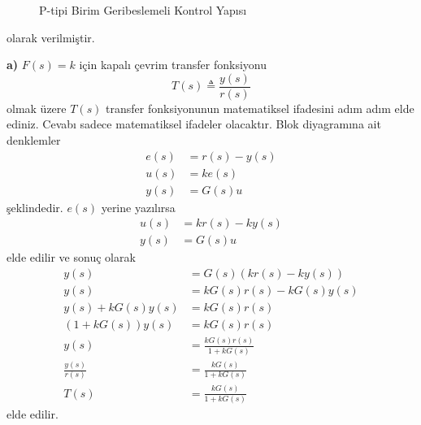 \begin{figure}[!h]
	\centering
	\caption{P-tipi Birim Geribeslemeli Kontrol Yapısı}
	\label{fig:PTipiKontrolBlokDiyagrami}
\end{figure}
olarak verilmiştir.

\noindent\textbf{a)} $F(s)=k$ için kapalı çevrim transfer fonksiyonu
\begin{equation*}
	T(s)\triangleq \frac{y(s)}{r(s)}
\end{equation*}
olmak üzere $T(s)$ transfer fonksiyonunun matematiksel ifadesini adım adım elde ediniz. Cevabı sadece matematiksel ifadeler olacaktır.
Blok diyagramına ait denklemler
\begin{equation}
\begin{split}
    e(s)&=r(s)-y(s)\\
    u(s)&=k e(s)\\
    y(s)&=G(s)u
\end{split}
\end{equation}
şeklindedir. $e(s)$ yerine yazılırsa
\begin{equation}
    \begin{split}
        u(s)&=k r(s)-k y(s)\\
        y(s)&=G(s)u
    \end{split}
\end{equation}
elde edilir ve sonuç olarak
\begin{equation}
    \begin{split}
        y(s)&=G(s)(k r(s)-k y(s))\\
        y(s)&=kG(s)r(s)-k G(s)y(s)\\
        y(s)+k G(s)y(s)&=kG(s)r(s)\\
        (1+k G(s))y(s)&=kG(s)r(s)\\
        y(s)&=\frac{kG(s)r(s)}{1+k G(s)}\\
        \frac{y(s)}{r(s)}&=\frac{kG(s)}{1+k G(s)}\\
        T(s)&=\frac{kG(s)}{1+k G(s)}
    \end{split}
\end{equation}
elde edilir.

